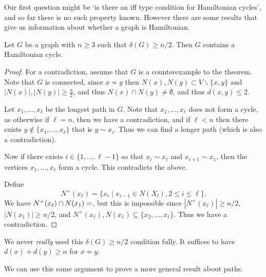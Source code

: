 \documentclass[a4paper]{scrartcl}
\begin{document}
\begin{center}

\end{center}


Our first question might be `is there an iff type condition for Hamiltonian cycles', and so far there is no such property known. However there are some results that give us information about whether a graph is Hamiltonian.

\begin{theorem}
	Let $G$ be a graph with $n\geq 3$ such that $\delta(G) \geq n/2$. Then $G$ contains a Hamiltonian cycle.
\end{theorem}
\begin{proof}
	For a contradiction, assume that $G$ is a counterexample to the theorem.
	Note that $G$ is connected, since $x \not \sim y$ then $N(x), N(y) \subset V \backslash\{x, y\}$ and $|N(x)|, |N(y)| \geq \frac{n}{2}$, and thus $N(x) \cap N(y) \neq \emptyset$, and thus $d(x, y) \leq 2$.

	Let $x_1, \dots, x_\ell$ be the longest path in $G$. Note that $x_1, \dots, x_\ell$ does not form a cycle, as otherwise if $\ell = n$, then we have a contradiction, and if $\ell < n$ then there exists $y \not \in \{x_1, \dots, x_\ell\}$ that is $y \sim x_i$. Thus we can find a longer path (which is also a contradiction).

	Now if there exists $i \in \{1, \dots, \ell - 1\}$ so that $x_i \sim x_\ell$ and $x_{i + 1} \sim x_1$, then the vertices $x_1, \dots, x_\ell$ form a cycle. This contradicts the above.

	Define
	$$
	N^+(x_\ell) = \{x_i \mid x_{i - 1} \in N(X_l), 2 \leq i \leq \ell\}.
	$$
	We have $N^+(x_\ell) \cap N(x_1) = \empty$, but this is impossible since $|N^+(x_\ell)| \geq n/2$, $|N(x_1)| \geq n/2$, and $N^+(x_\ell), N(x_1) \subseteq \{x_2, \dots, x_\ell\}$. Thus we have a contradiction.
\end{proof}

\begin{remark}
	We never \emph{really} used this $\delta(G) \geq n/2$ condition fully. It suffices to have $d(x) + d(y) \geq n$ for $x \not \sim y$.
\end{remark}

We can use this same argument to prove a more general result about paths.
\end{document}
